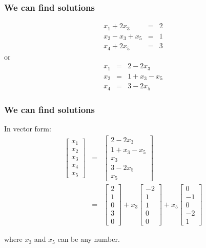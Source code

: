 \begin{frame}
  \frametitle{We can find solutions}
  

  \begin{eqnarray*}
    x_1 + 2x_3 & = & 2 \\
    x_2 - x_3 + x_5 & = & 1 \\
    x_4 + 2x_5 & = & 3 
  \end{eqnarray*}
  or
  \begin{eqnarray*}
    x_1  & = & 2 -  2x_3\\
    x_2  & = & 1 +  x_3 - x_5\\
    x_4  & = & 3 - 2x_5
  \end{eqnarray*}

\end{frame}

\begin{frame}
  \frametitle{We can find solutions}

  In vector form:
  \begin{eqnarray*}
    \left[ \begin{array}{r}x_1\\x_2\\x_3\\x_4\\x_5\end{array}\right] & = & 
    \left[ \begin{array}{r}2-2x_3\\1+x_3-x_5\\x_3\\3-2x_5\\x_5\end{array}\right] \\
    & = & 
    \left[ \begin{array}{r}2\\1\\0\\3\\0\end{array}\right] 
    + x_3 \left[ \begin{array}{r}-2\\1\\1\\0\\0\end{array}\right]
    + x_5 \left[ \begin{array}{r}0\\-1\\0\\-2\\1\end{array}\right]
  \end{eqnarray*}

  where $x_3$ and $x_5$ can be any number.

  
\end{frame}


